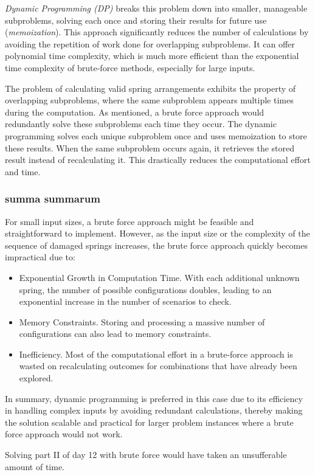 \documentclass[a4paper,11pt]{article}
\begin{document}
\emph{Dynamic Programming (DP)} breaks this problem down into smaller,
manageable subproblems, solving each once and storing their results for
future use (\emph{memoization}).
This approach significantly reduces the number of
calculations by avoiding the repetition of work done for overlapping
subproblems.
It can offer polynomial time complexity, which is much
more efficient than the exponential time complexity of brute-force methods,
especially for large inputs.

The problem of calculating valid spring arrangements exhibits the property of
overlapping subproblems, where the same subproblem appears multiple times
during the computation.
As mentioned, a brute force approach would redundantly solve these
subproblems each time they occur.
The dynamic programming solves each unique subproblem
once and uses
memoization to store these results.
When the same subproblem occurs again, it
retrieves the stored result instead of recalculating it.
This drastically
reduces the computational effort and time.

\subsubsection*{summa summarum}
For small input sizes, a brute force approach might be feasible and
straightforward to implement.
However, as the input size or the complexity of
the sequence of damaged springs increases, the brute force approach quickly
becomes impractical due to:
\begin{itemize}
    \item Exponential Growth in Computation Time. With each additional unknown
spring, the number of possible configurations doubles, leading to an
exponential increase in the number of scenarios to check.
    \item Memory Constraints. Storing and processing a massive number of
configurations can also lead to memory constraints.
    \item Inefficiency. Most of the computational effort in a brute-force approach
is wasted on recalculating outcomes for combinations that have already been
explored.
    \end{itemize}
In summary, dynamic programming is preferred in this case due to its efficiency
in handling complex inputs by avoiding redundant calculations, thereby making
the solution scalable and practical for larger problem instances where a brute
force approach would not work.

Solving part II of day 12 with brute force would have taken an
unsufferable amount of time.
\end{document}
